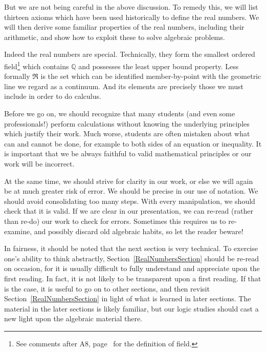 But we are not being careful in the above discussion.  
To remedy this, we will list  thirteen axioms which 
have been used historically to 
define the real numbers.  We will then derive some
familiar properties of the real numbers,
including their arithmetic, and
show how to exploit these to solve algebraic problems.

Indeed the real numbers are special.  Technically, they form
the smallest ordered field\footnote{%
See comments after A8, page~\pageref{A8Page} for the definition
of field.
} which contains $\mathbb{Q}$
and possesses the least upper bound property.  Less
formally $\Re$ is the set which can be identified
member-by-point with the geometric line we regard as
a continuum.  And its elements 
are precisely those we must include in order
to do calculus. 

\bigskip

Before we go on, we should recognize that
many students (and even some professionals!)
perform calculations without knowing the
underlying principles  which  justify
their work.  Much worse, students are often
mistaken about what can and cannot be done, for example
to both sides of an equation or inequality.
It is important that we be always
faithful to valid mathematical principles or our work will be
incorrect.  

At the same time, we should strive
for clarity in our work, or else we will again be at much
greater risk of error.  We should be precise in
our use of notation.  We should  avoid consolidating
too many steps.  With every manipulation,
we should check that it is valid.  If we are clear in
our presentation,
we can re-read (rather than re-do) our work to check
for errors.  Sometimes this requires us to re-examine, and
possibly discard old algebraic habits, so let the 
reader beware!

In fairness, it should be noted that the next section is
very technical.  To exercise one's ability to think abstractly,
Section~\ref{RealNumbersSection} should be re-read
on occasion, for it is usually difficult to fully understand and
appreciate upon the first reading.  In fact,
it is not likely to be transparent upon a first reading.
If that is the case, it is useful to go on to other sections,
and then revisit Section~\ref{RealNumbersSection} in light of what 
is learned in later sections.  The material in the later sections
is likely familiar, but our logic studies should cast a new light
upon the algebraic material there.






